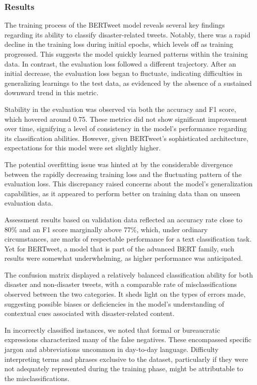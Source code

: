 \documentclass[10pt,table]{article}
\begin{document}
\subsubsection{Results}
The training process of the BERTweet model reveals several key findings regarding its ability to classify disaster-related tweets. Notably, there was a rapid decline in the training loss during initial epochs, which levels off as training progressed. This suggests the model quickly learned patterns within the training data. In contrast, the evaluation loss followed a different trajectory. After an initial decrease, the evaluation loss began to fluctuate, indicating difficulties in generalizing learnings to the test data, as evidenced by the absence of a sustained downward trend in this metric.

Stability in the evaluation was observed via both the accuracy and F1 score, which hovered around 0.75. These metrics did not show significant improvement over time, signifying a level of consistency in the model's performance regarding its classification abilities. However, given BERTweet's sophisticated architecture, expectations for this model were set slightly higher.

The potential overfitting issue was hinted at by the considerable divergence between the rapidly decreasing training loss and the fluctuating pattern of the evaluation loss. This discrepancy raised concerns about the model's generalization capabilities, as it appeared to perform better on training data than on unseen evaluation data.

Assessment results based on validation data reflected an accuracy rate close to 80\% and an F1 score marginally above 77\%, which, under ordinary circumstances, are marks of respectable performance for a text classification task. Yet for BERTweet, a model that is part of the advanced BERT family, such results were somewhat underwhelming, as higher performance was anticipated.

The confusion matrix displayed a relatively balanced classification ability for both disaster and non-disaster tweets, with a comparable rate of misclassifications observed between the two categories. It sheds light on the types of errors made, suggesting possible biases or deficiencies in the model's understanding of contextual cues associated with disaster-related content.

In incorrectly classified instances, we noted that formal or bureaucratic expressions characterized many of the false negatives. These encompassed specific jargon and abbreviations uncommon in day-to-day language. Difficulty interpreting terms and phrases exclusive to the dataset, particularly if they were not adequately represented during the training phase, might be attributable to the misclassifications.
\end{document}
